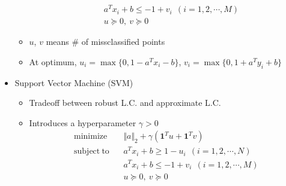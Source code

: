 \begin{itemize}
\begin{itemize}
\begin{equation}
\begin{aligned}
                &~~a^Tx_i+b\leq-1+v_i~~(i=1,2,\cdots,M) \\
                &~~u\succeq0,~v\succeq0
        \end{aligned}\end{equation}
        \item $u$, $v$ means \# of missclassified points
        \item At optimum, $u_i=\max\{0,1-a^Tx_i-b\}$, $v_i=\max\{0,1+a^Ty_i+b\}$
    \end{itemize}
    \item Support Vector Machine (SVM)
    \begin{itemize}
        \item Tradeoff between robust L.C. and approximate L.C.
        \item Introduces a hyperparameter $\gamma>0$
        \begin{equation}\begin{aligned}
            \mathrm{minimize}~~&~~\Vert a\Vert_2+\gamma(\mathbf{1}^Tu+\mathbf{1}^Tv) \\
            \mathrm{subject~to}~~&~~a^Tx_i+b\geq1-u_i~~(i=1,2,\cdots,N) \\
                &~~a^Tx_i+b\leq-1+v_i~~(i=1,2,\cdots,M) \\
                &~~u\succeq0,~v\succeq0
        \end{aligned}\end{equation}
    \end{itemize}
\end{itemize}
\begin{figures}
\end{figures}
